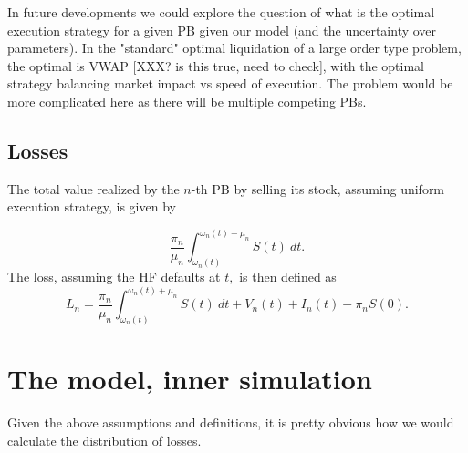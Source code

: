 \documentclass{article}
\begin{document}
In future developments we could explore the question of what is the optimal
execution strategy for a given PB given our model (and the uncertainty over
parameters). In the "standard" optimal liquidation of a large order type
problem, the optimal is VWAP [XXX? is this true, need to check], with the
optimal strategy balancing market impact vs speed of execution. The problem
would be more complicated here as there will be multiple competing PBs.

\subsection{Losses}

The total value realized by the $n$-th PB by selling its stock, assuming
uniform execution strategy, is given by

\begin{equation*}
\frac{\pi _{n}}{\mu _{n}}\int_{\omega _{n}(t)}^{\omega _{n}(t)+\mu
_{n}}S(t)~dt.
\end{equation*}%
The loss, assuming the HF defaults at $t,$ is then defined as%
\begin{equation}
L_{n}=\frac{\pi _{n}}{\mu _{n}}\int_{\omega _{n}(t)}^{\omega _{n}(t)+\mu
_{n}}S(t)~dt+V_{n}(t)+I_{n}(t)-\pi _{n}S(0).  \label{eq:loss1}
\end{equation}

\section{The model, inner simulation}

Given the above assumptions and definitions, it is pretty obvious how we
would calculate the distribution of losses. 
\end{document}
